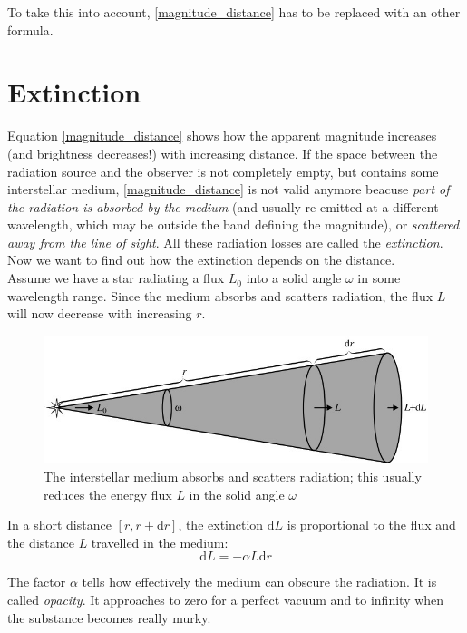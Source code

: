 \documentclass[a4paper,11pt,twoside]{book}
\newcommand{\de}[0]{\textrm{d}}
\begin{document}
To take this into account, \eqref{magnitude_distance} has to be replaced with an other formula.

\section{Extinction}

Equation \eqref{magnitude_distance} shows how the apparent magnitude increases (and brightness decreases!) with increasing distance. If the space between the radiation source and the observer is not completely empty, but contains some interstellar medium, \eqref{magnitude_distance} is not valid anymore beacuse \textit{part of the radiation is absorbed by the medium} (and usually re-emitted at a different wavelength, which may be outside the band defining the magnitude), or \textit{scattered away from the line of sight}. All these radiation losses are called the \textit{extinction}.\\

Now we want to find out how the extinction depends on the distance.\\

Assume we have a star radiating a flux $L_0$ into a solid angle $\omega$ in some wavelength range. Since the medium absorbs and scatters radiation, the flux $L$ will now decrease with increasing $r$.

\begin{figure}[H]
	\centering
	\includegraphics[width=0.7\linewidth]{images/interstellar_medium_absorbs.jpg}
	\caption{The interstellar
		medium absorbs and scatters radiation; this usually reduces the energy flux $L$ in the solid angle $\omega$}
	\label{fig:interstellar_medium_absorbs}
\end{figure}

In a short distance $[r, r+\de r]$, the extinction $\de L$ is proportional to the flux and the distance $L$ travelled in the medium: 
\begin{equation}
	\de L = -\alpha L \de r
	\label{eq:opacity}
\end{equation}

The factor $\alpha$ tells how effectively the medium can obscure the radiation. It is called \textit{opacity}. It approaches to zero for a perfect vacuum and to infinity when the substance becomes really murky.\\
\end{document}

